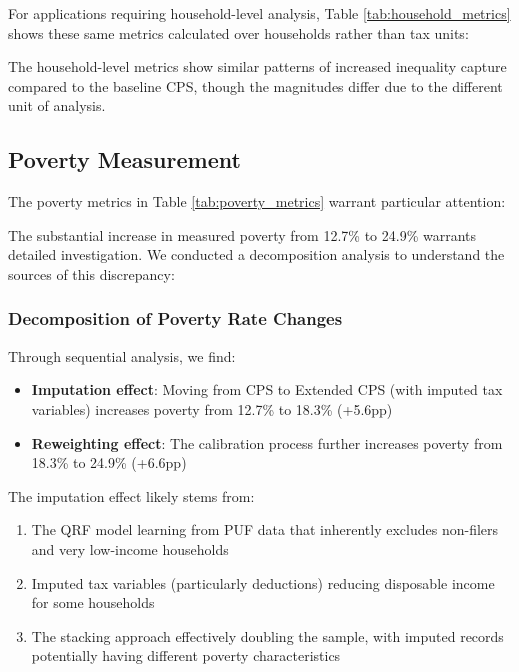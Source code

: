 For applications requiring household-level analysis, Table \ref{tab:household_metrics} shows these same metrics calculated over households rather than tax units:



The household-level metrics show similar patterns of increased inequality capture compared to the baseline CPS, though the magnitudes differ due to the different unit of analysis.

\subsection{Poverty Measurement}

The poverty metrics in Table \ref{tab:poverty_metrics} warrant particular attention:



The substantial increase in measured poverty from 12.7\% to 24.9\% warrants detailed investigation. We conducted a decomposition analysis to understand the sources of this discrepancy:

\subsubsection{Decomposition of Poverty Rate Changes}

Through sequential analysis, we find:
\begin{itemize}
    \item \textbf{Imputation effect}: Moving from CPS to Extended CPS (with imputed tax variables) increases poverty from 12.7\% to 18.3\% (+5.6pp)
    \item \textbf{Reweighting effect}: The calibration process further increases poverty from 18.3\% to 24.9\% (+6.6pp)
\end{itemize}

The imputation effect likely stems from:
\begin{enumerate}
    \item The QRF model learning from PUF data that inherently excludes non-filers and very low-income households
    \item Imputed tax variables (particularly deductions) reducing disposable income for some households
    \item The stacking approach effectively doubling the sample, with imputed records potentially having different poverty characteristics
\end{enumerate}


